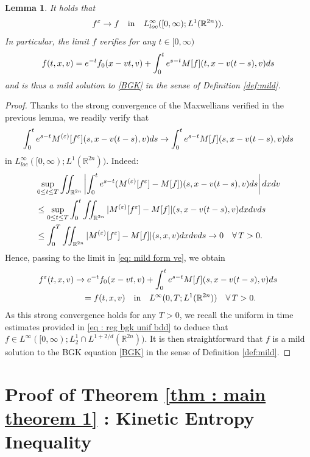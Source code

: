 \documentclass{amsart}
\theoremstyle{plain}
\newtheorem{lemma}[theorem]{Lemma}
\theoremstyle{remark}
\numberwithin{equation}{section}
\newcommand{\R}{\mathbb{R}}
\newcommand{\ve}{\varepsilon}
\newcommand{\dx}{\textnormal{d}x}
\newcommand{\dv}{\textnormal{d}v}
\newcommand{\ds}{\textnormal{d}s}
\begin{document}
\begin{lemma}
\label{lem : conv of fve}
    It holds that
    \begin{align*}
        f^\ve \to f \quad\text{in}\quad L^\infty_{\rm loc}([0,\infty);L^1(\R^{2n})).
    \end{align*}
    In particular, the limit $f$ verifies for any $t\in [0,\infty)$
    \begin{align*}
        f(t,x,v) = e^{-t} f_0(x-vt,v) + \int_0^t e^{s-t}M[f](t,x-v(t-s),v) \ds
    \end{align*}
    and is thus a mild solution to \eqref{BGK} in the sense of Definition \ref{def:mild}.
\end{lemma}
\begin{proof}
Thanks to the strong convergence of the Maxwellians verified in the previous lemma, we readily verify that
\begin{align*}
    \int_0^t e^{s-t} M^{(\ve)}[f^\ve](s,x-v(t-s),v)\ds \to \int_0^t e^{s-t} M[f](s,x-v(t-s),v)\ds 
\end{align*}
in $L^\infty_{loc}([0,\infty);L^1(\R^{2n}))$. Indeed:
\begin{align*}
    &\sup_{0\le t \le T} \iint_{\R^{2n}}\left|\int_0^t e^{s-t} (M^{(\ve)}[f^\ve] - M[f])(s,x-v(t-s),v) \ds\right| \dx\dv \\
    &\le \sup_{0\le t \le T} \int_0^t \iint_{\R^{2n}}  |M^{(\ve)}[f^\ve] - M[f]|(s,x-v(t-s),v) \dx\dv\ds \\
    &\le \int_0^T \iint_{\R^{2n}}  |M^{(\ve)}[f^\ve] - M[f]|(s,x,v) \dx\dv\ds \to 0 \quad \forall \, T>0.
\end{align*}
Hence, passing to the limit in \eqref{eq: mild form ve}, we obtain
\begin{align*}
    f^\ve (t,x,v) &\to e^{-t}f_0(x-vt,v) + \int_0^t e^{s-t} M[f](s,x-v(t-s),v) \ds\\
    &\quad = f(t,x,v) \quad \text{in} \quad L^\infty(0,T;L^1(\R^{2n})) \quad \forall \, T>0.
\end{align*}
As this strong convergence holds for any $T>0$, we recall the uniform in time estimates provided in \eqref{eq : reg bgk unif bdd} to deduce that $f \in L^\infty([0,\infty);L^1_2 \cap L^{1+2/d} (\R^{2n}))$. It is then straightforward that $f$ is a mild solution to the BGK equation \eqref{BGK} in the sense of Definition \ref{def:mild}.
\end{proof}


\section{Proof of Theorem \ref{thm : main theorem 1} : Kinetic Entropy Inequality} \label{sec:kei} 
\end{document}
